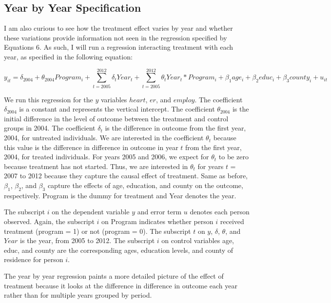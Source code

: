 \documentclass[a4paper]{article}
\begin{document}
\subsection{Year by Year Specification}

I am also curious to see how the treatment effect varies by year and whether these variations provide information not seen in the regression specified by Equations 6. As such, I will run a regression interacting treatment with each year, as specified in the following equation:

\begin{equation}
y_{it} = \delta_{2004} + \theta_{2004} Program_i + \sum_{t=2005}^{2012} \delta_t Year_t + \sum_{t=2005}^{2012} \theta_t Year_t * Program_i + \beta_{1} age_i + \beta_{2} educ_i + \beta_{3} county_i + u_{it}
\end{equation}

We run this regression for the $y$ variables $heart$, $er$, and $employ$. The coefficient $\delta_{2004}$ is a constant and represents the vertical intercept. The coefficient $\theta_{2004}$ is the initial difference in the level of outcome between the treatment and control groups in 2004. The coefficient $\delta_t$ is the difference in outcome from the first year, 2004, for untreated individuals. We are interested in the coefficient $\theta_t$ because this value is the difference in difference in outcome in year $t$ from the first year, 2004, for treated individuals. For years 2005 and 2006, we expect for $\theta_t$ to be zero because treatment has not started. Thus, we are interested in $\theta_t$ for years $t$ = 2007 to 2012 because they capture the causal effect of treatment. Same as before, $\beta_{1}$, $\beta_{2}$, and $\beta_{3}$ capture the effects of age, education, and county on the outcome, respectively. Program is the dummy for treatment and Year denotes the year.

The subscript $i$ on the dependent variable $y$ and error term $u$ denotes each person observed. Again, the subscript $i$ on Program indicates whether person $i$ received treatment (program = 1) or not (program = 0). The subscript $t$ on $y$, $\delta$, $\theta$, and $Year$ is the year, from 2005 to 2012. The subscript $i$ on control variables age, educ, and county are the corresponding ages, education levels, and county of residence for person $i$.

The year by year regression paints a more detailed picture of the effect of treatment because it looks at the difference in difference in outcome each year rather than for multiple years grouped by period.
\end{document}
